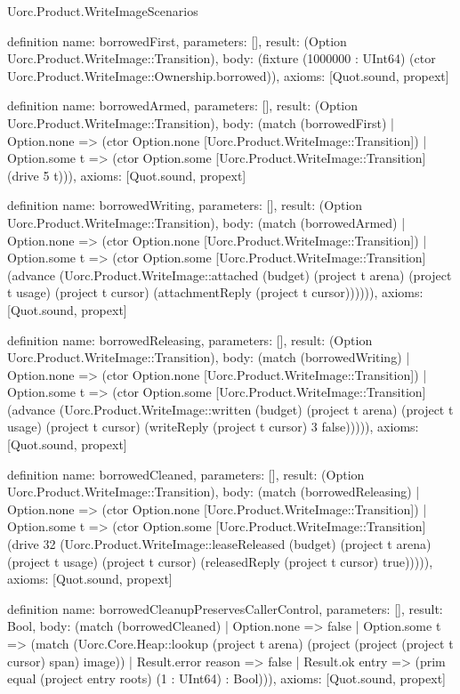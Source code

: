 \begin{lexlean}{Uorc.Product.WriteImageScenarios}
\begin{semanticmodule}
definition{
  name: borrowedFirst,
  parameters: [],
  result: (Option Uorc.Product.WriteImage::Transition),
  body: (fixture (1000000 : UInt64) (ctor Uorc.Product.WriteImage::Ownership.borrowed)),
  axioms: [Quot.sound, propext]
}

definition{
  name: borrowedArmed,
  parameters: [],
  result: (Option Uorc.Product.WriteImage::Transition),
  body: (match (borrowedFirst)
    | Option.none => (ctor Option.none [Uorc.Product.WriteImage::Transition])
    | Option.some t => (ctor Option.some [Uorc.Product.WriteImage::Transition] (drive 5 t))),
  axioms: [Quot.sound, propext]
}

definition{
  name: borrowedWriting,
  parameters: [],
  result: (Option Uorc.Product.WriteImage::Transition),
  body: (match (borrowedArmed)
    | Option.none => (ctor Option.none [Uorc.Product.WriteImage::Transition])
    | Option.some t => (ctor Option.some [Uorc.Product.WriteImage::Transition] (advance (Uorc.Product.WriteImage::attached (budget) (project t arena) (project t usage) (project t cursor) (attachmentReply (project t cursor)))))),
  axioms: [Quot.sound, propext]
}

definition{
  name: borrowedReleasing,
  parameters: [],
  result: (Option Uorc.Product.WriteImage::Transition),
  body: (match (borrowedWriting)
    | Option.none => (ctor Option.none [Uorc.Product.WriteImage::Transition])
    | Option.some t => (ctor Option.some [Uorc.Product.WriteImage::Transition] (advance (Uorc.Product.WriteImage::written (budget) (project t arena) (project t usage) (project t cursor) (writeReply (project t cursor) 3 false))))),
  axioms: [Quot.sound, propext]
}

definition{
  name: borrowedCleaned,
  parameters: [],
  result: (Option Uorc.Product.WriteImage::Transition),
  body: (match (borrowedReleasing)
    | Option.none => (ctor Option.none [Uorc.Product.WriteImage::Transition])
    | Option.some t => (ctor Option.some [Uorc.Product.WriteImage::Transition] (drive 32 (Uorc.Product.WriteImage::leaseReleased (budget) (project t arena) (project t usage) (project t cursor) (releasedReply (project t cursor) true))))),
  axioms: [Quot.sound, propext]
}

definition{
  name: borrowedCleanupPreservesCallerControl,
  parameters: [],
  result: Bool,
  body: (match (borrowedCleaned)
    | Option.none => false
    | Option.some t => (match (Uorc.Core.Heap::lookup (project t arena) (project (project (project t cursor) span) image))
      | Result.error reason => false
      | Result.ok entry => (prim equal (project entry roots) (1 : UInt64) : Bool))),
  axioms: [Quot.sound, propext]
}


\end{semanticmodule}
\end{lexlean}
